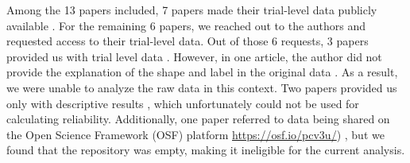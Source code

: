 \documentclass[sn-apa]{sn-jnl}%
\theoremstyle{thmstyleone}%
\theoremstyle{thmstyletwo}%
\theoremstyle{thmstylethree}%
\begin{document}
Among the 13 papers included, 7 papers made their trial-level data publicly available \parencite{constable2021affective,constable2020sticking,golubickis2021judging,navon2021are,qian2020prioritised,schafer2019understanding,svensson2022more}. For the remaining 6 papers, we reached out to the authors and requested access to their trial-level data. Out of those 6 requests, 3 papers provided us with trial level data \parencite{kolvoort2020temporal,wozniak2018prioritization,xu2021romantic}. However, in one article, the author did not provide the explanation of the shape and label in the original data \parencite{kolvoort2020temporal}. As a result, we were unable to analyze the raw data in this context. Two papers provided us only with descriptive results \parencite{cheng2019saliency,martinez2020examining}, which unfortunately could not be used for calculating reliability. Additionally, one paper referred to data being shared on the Open Science Framework (OSF) platform \url{https://osf.io/pcv3u/}) \parencite{bukowski2021socio}, but we found that the repository was empty, making it ineligible for the current analysis. 
\end{document}
